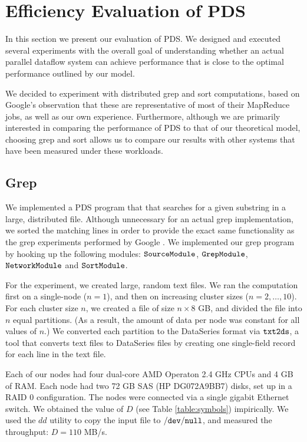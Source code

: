 \documentclass{acm_proc_article-sp}
\begin{document}
\section{Efficiency Evaluation of PDS}


In this section we present our evaluation of PDS. We designed and executed
several experiments with the overall goal of understanding whether an actual
parallel dataflow system can achieve performance that is close to the optimal
performance outlined by our model.

We decided to experiment with distributed grep and sort computations, based on
Google's observation that these are representative of most of their MapReduce
jobs, as well as our own experience. Furthermore, although we are primarily
interested in comparing the performance of PDS to that of our theoretical
model, choosing grep and sort allows us to compare our results with other
systems that have been measured under these workloads.

\subsection{Grep}

We implemented a PDS program that that searches for a given substring in
a large, distributed file. Although unnecessary for an actual grep
implementation, we sorted the matching lines in order to provide the exact same
functionality as the grep experiments performed by Google \cite{mapreduce}. We
implemented our grep program by hooking up the following modules:
$\tt SourceModule$, $\tt GrepModule$, $\tt NetworkModule$ and $\tt SortModule$.

For the experiment, we created large, random text files. We ran the computation
first on a single-node ($n = 1$), and then on increasing cluster sizes ($n = 2,
\ldots, 10$). For each cluster size $n$, we created a file of size $n \times 8$
GB, and divided the file into $n$ equal partitions. (As a result, the amount
of data per node was constant for all values of $n$.) We converted each
partition to the DataSeries format via $\tt txt2ds$, a tool that converts text files to DataSeries files by creating one single-field record for each line in
the text file.

Each of our nodes had four dual-core AMD Operaton 2.4 GHz CPUs and 4 GB of RAM.
Each node had two 72 GB SAS (HP DG072A9BB7) disks, set up in a RAID 0
configuration. The nodes were connected via a single gigabit Ethernet switch.
We obtained the value of $D$ (see Table \ref{table:symbols})
impirically. We used the $dd$ utility to copy the input file to $\tt /dev/null$,
and measured the throughput: $D = 110$ MB/s.
\end{document}
